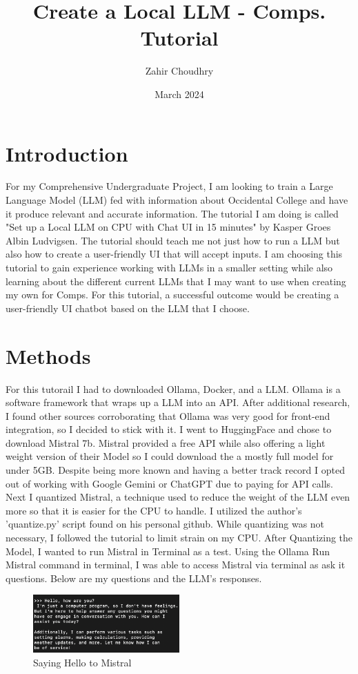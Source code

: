 \documentclass{article}
\title{Create a Local LLM - Comps. Tutorial}
\author{Zahir Choudhry}
\date{March 2024}
\begin{document}
\maketitle

\section{Introduction}
For my Comprehensive Undergraduate Project, I am looking to train a Large Language Model (LLM) fed with information about Occidental College and have it produce relevant and accurate information. The tutorial I am doing is called "Set up a Local LLM on CPU with Chat UI in 15 minutes" by Kasper Groes Albin Ludvigsen. The tutorial should teach me not just how to run a LLM but also how to create a user-friendly UI that will accept inputs. I am choosing this tutorial to gain experience working with LLMs in a smaller setting while also learning about the different current LLMs that I may want to use when creating my own for Comps. For this tutorial, a successful outcome would be creating a user-friendly UI chatbot based on the LLM that I choose.

\section{Methods}
For this tutorail I had to downloaded Ollama, Docker, and a LLM. Ollama is a software framework that wraps up a LLM into an API. After additional research, I found other sources corroborating that Ollama was very good for front-end integration, so I decided to stick with it. I went to HuggingFace and chose to download Mistral 7b. Mistral provided a free API while also offering a light weight version of their Model so I could download the a mostly full model for under 5GB. Despite being more known and having a better track record I opted out of working with Google Gemini or ChatGPT due to paying for API calls. 
Next I quantized Mistral, a technique used to reduce the weight of the LLM even more so that it is easier for the CPU to handle. I utilized the author's 'quantize.py' script found on his personal github. While quantizing was not necessary, I followed the tutorial to limit strain on my CPU. After Quantizing the Model, I wanted to run Mistral in Terminal as a test. Using the Ollama Run Mistral command in terminal, I was able to access Mistral via terminal as ask it questions. Below are my questions and the LLM's responses.
\vspace{\baselineskip}
\begin{figure}[H]
    \centering
    \includegraphics[width=0.5\textwidth]{Question1.png}
    \caption{Saying Hello to Mistral}
    \label{fig:example}
\end{figure}
\end{document}
